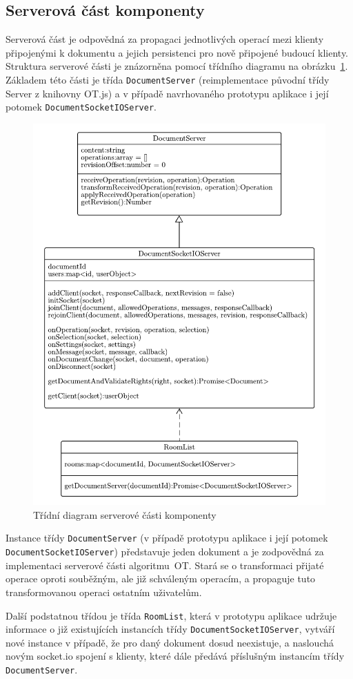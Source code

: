 

\subsection{Serverová část komponenty}\label{subsec:serverováČást}

Serverová část je odpovědná za propagaci jednotlivých operací mezi klienty připojenými k dokumentu a jejich persistenci pro nově připojené budoucí klienty.
Struktura serverové části je znázorněna pomocí třídního diagramu na obrázku~\ref{fig:DocumentServer}.
Základem této části je třída \texttt{DocumentServer} (reimplementace původní třídy Server z knihovny OT.js) a v případě navrhovaného prototypu aplikace i její potomek \texttt{DocumentSocketIOServer}.

\begin{figure}[ht!]
    \centering
    \includegraphics[width=.8\textwidth]{partials/navrh/editor/DocumentServer.pdf}
    \caption{Třídní diagram serverové části komponenty}\label{fig:DocumentServer}
\end{figure}

Instance třídy \texttt{DocumentServer} (v případě prototypu aplikace i její potomek \texttt{DocumentSocketIOServer}) představuje jeden dokument a je zodpovědná za implementaci serverové části algoritmu~\gls{OT}.
Stará se o transformaci přijaté operace oproti souběžným, ale již schváleným operacím, a propaguje tuto transformovanou operaci ostatním uživatelům.

Další podstatnou třídou je třída \texttt{RoomList}, která v prototypu aplikace udržuje informace o již existujících instancích třídy \texttt{DocumentSocketIOServer}, vytváří nové instance v případě, že pro daný dokument dosud neexistuje, a naslouchá novým socket.io spojení s klienty, které dále předává příslušným instancím třídy \texttt{DocumentServer}.
